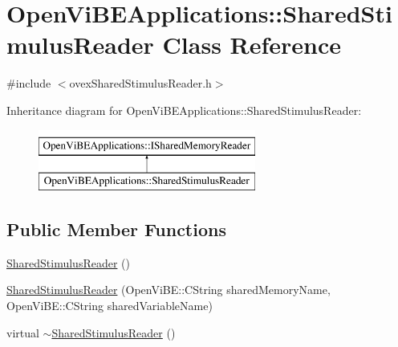 \hypertarget{classOpenViBEApplications_1_1SharedStimulusReader}{
\section{OpenViBEApplications::SharedStimulusReader Class Reference}
\label{classOpenViBEApplications_1_1SharedStimulusReader}
}


{\ttfamily \#include $<$ovexSharedStimulusReader.h$>$}

Inheritance diagram for OpenViBEApplications::SharedStimulusReader:\begin{figure}[H]
\begin{center}
\leavevmode
\includegraphics[height=2.000000cm]{classOpenViBEApplications_1_1SharedStimulusReader}
\end{center}
\end{figure}
\subsection*{Public Member Functions}
\begin{DoxyCompactItemize}
\item 
\hyperlink{classOpenViBEApplications_1_1SharedStimulusReader_a0be784ef4c7abdcdbad4233f9df2ced2}{SharedStimulusReader} ()
\item 
\hyperlink{classOpenViBEApplications_1_1SharedStimulusReader_a258d40512f3b85a065f52d9a987fc89e}{SharedStimulusReader} (OpenViBE::CString sharedMemoryName, OpenViBE::CString sharedVariableName)
\item 
virtual \hyperlink{classOpenViBEApplications_1_1SharedStimulusReader_a506f7f3d4c36aadb751cf465c34fa7b1}{$\sim$SharedStimulusReader} ()
\end{DoxyCompactItemize}
